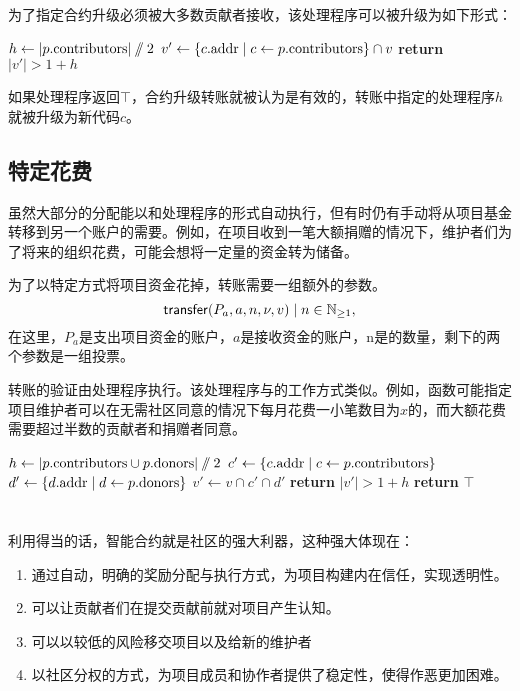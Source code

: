 为了指定合约升级必须被大多数贡献者接收，该处理程序可以被升级为如下形式：
\begin{algorithmic}[0]
        \State $h \gets |p.{\mathrm{contributors}}| \sslash 2$
        \State $v' \gets \{ c.{\mathrm{addr}} \mid c \gets p.{\mathrm{contributors}} \} \cap v$
        \State \textbf{return} $|v'| > 1 + h$
    \EndProcedure
\end{algorithmic}
如果处理程序返回$\top$，合约升级转账就被认为是有效的，转账中指定的处理程序$h$就被升级为新代码$c$。

\subsection{特定花费}

虽然大部分\oscoin{}的分配能以和处理程序的形式自动执行，但有时仍有手动将\oscoin{}从项目基金转移到另一个账户的需要。例如，在项目收到一笔大额捐赠的情况下，维护者们为了将来的组织花费，可能会想将一定量的资金转为储备。

为了以特定方式将项目资金花掉，转账需要一组额外的参数。
\[
    \mathsf{transfer}\lparen P_a, a, n, \nu, v\rparen \mid n \in \mathbb{N}_{\geq 1},
\]
在这里，$P_a$是支出项目资金的账户，$a$是接收资金的账户，n是\oscoin{}的数量，剩下的两个参数是一组投票。

转账的验证由处理程序执行。该处理程序与的工作方式类似。例如，函数可能指定项目维护者可以在无需社区同意的情况下每月花费一小笔数目为$x$的\oscoin{}，而大额花费需要超过半数的贡献者和捐赠者同意。
\medskip
\begin{algorithmic}[0]
            \State $h \gets |p.{\mathrm{contributors}} \cup p.{\mathrm{donors}}| \sslash 2$
            \State $c' \gets \{ c.{\mathrm{addr}} \mid c \gets p.{\mathrm{contributors}} \}$
            \State $d' \gets \{ d.{\mathrm{addr}} \mid d \gets p.{\mathrm{donors}} \}$
            \State $v' \gets v \cap c' \cap d'$
            \State \textbf{return} $|v'| > 1 + h$
            \Else
            \State \textbf{return} $\top$
        \EndIf
    \EndProcedure
\end{algorithmic}

\section*{}

利用得当的话，智能合约就是社区的强大利器，这种强大体现在：

\begin{enumerate}
    \item 通过自动，明确的奖励分配与执行方式，为项目构建内在信任，实现透明性。
    \item 可以让贡献者们在提交贡献前就对项目产生认知。
    \item 可以以较低的风险移交项目以及\oscoin{}给新的维护者
    \item 以社区分权的方式，为项目成员和协作者提供了稳定性，使得作恶更加困难。
\end{enumerate}
